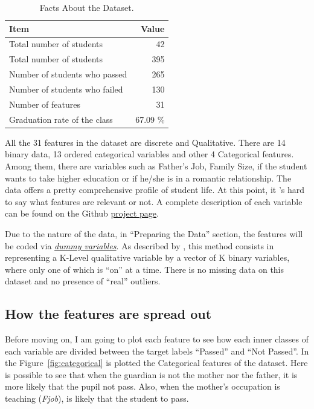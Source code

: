 \documentclass[a4paper]{article}
\begin{document}
\begin{table}[ht]
\centering
\begin{tabular}{l|r}
Item & Value \\\hline
Total number of students & 42 \\
Total number of students & 395 \\
Number of students who passed & 265 \\
Number of students who failed & 130 \\
Number of features & 31 \\
Graduation rate of the class & 67.09 \%

\end{tabular}
\caption{\label{tab:basicfacts}Facts About the Dataset.}
\end{table}

All the 31 features in the dataset are discrete and Qualitative. There are 14 binary data, 13 ordered categorical variables and other 4 Categorical features. Among them, there are variables such as Father's Job, Family Size, if the student wants to take higher education or if he/she is in a romantic relationship. The data offers a pretty comprehensive profile of student life. At this point, it 's hard to say what features are relevant or not. A complete description of each variable can be found on the Github \href{https://github.com/udacity/machine-learning/tree/master/projects/student_intervention}{project page}.

Due to the nature of the data, in ``Preparing the Data'' section, the features will be coded via \href{https://www.moresteam.com/whitepapers/download/dummy-variables.pdf}{\textit{dummy variables}}. As described by \cite{Hastie_2009}, this method consists in representing a K-Level qualitative variable by a vector of K binary variables, where only one of which is ``on'' at a time. There is no missing data on this dataset and no presence of ``real'' outliers.



\subsection{How the features are spread out}
Before moving on, I am going to plot each feature to see how each inner classes of each variable are divided between the target labels ``Passed'' and ``Not Passed''. In the Figure~\ref{fig:categorical} is plotted the Categorical features of the dataset. Here is possible to see that when the guardian is not the mother nor the father, it is more likely that the pupil not pass. Also, when the mother's occupation is teaching (\textit{Fjob}), is likely that the student to pass.
\end{document}
